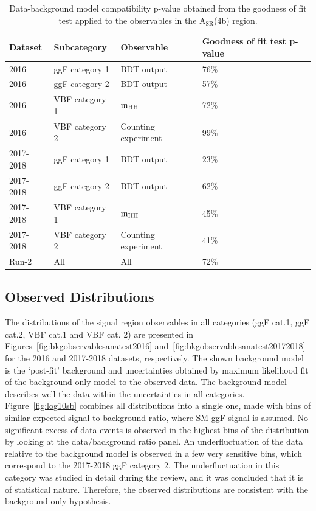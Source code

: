 \begin{table}[htbp!]
\caption[Data-background model compatibility p-value obtained from the goodness of fit test in the analysis region observables]{\label{tab:anacompatibilty} Data-background model compatibility p-value obtained from the goodness of fit test applied to the observables in the $\mathrm{A_{SR}}$(4b) region.}
\centering
\begin{tabularx}{\textwidth}{lllX}
    \hline
    Dataset          & Subcategory    & Observable           &  Goodness of fit test p-value\\    
    \hline
    2016      & ggF category 1 & BDT output  & 76\% \\
    2016      & ggF category 2 & BDT output  & 57\% \\
    2016      & VBF category 1 & $\mathrm{m_{HH}}$               & 72\% \\
    2016      & VBF category 2 & Counting experiment  & 99\% \\
    2017-2018 & ggF category 1 & BDT output  & 23\% \\
    2017-2018 & ggF category 2 & BDT output  & 62\% \\
    2017-2018 & VBF category 1 & $\mathrm{m_{HH}}$               & 45\% \\
    2017-2018 & VBF category 2 & Counting experiment  & 41\% \\
    Run-2     & All            & All                  & 72\% \\ 
    \hline
\end{tabularx}
\end{table}

\subsection{Observed Distributions} \label{results:obsdistributions}
The distributions of the signal region observables in all categories (ggF cat.1, ggF cat.2, VBF cat.1 and VBF cat. 2) are presented in Figures~\ref{fig:bkgobservablesanatest2016} and~\ref{fig:bkgobservablesanatest20172018} for the 2016 and 2017-2018 datasets, respectively. The shown background model is the `post-fit' background and uncertainties obtained by maximum likelihood fit of the background-only model to the observed data. The background model describes well the data within the uncertainties in all categories. Figure~\ref{fig:log10sb} combines all distributions into a single one, made with bins of similar expected signal-to-background ratio, where SM ggF signal is assumed. No significant excess of data events is observed in the highest bins of the distribution by looking at the data/background ratio panel.  An underfluctuation of the data relative to the background model is observed in a few very sensitive bins, which correspond to the 2017-2018 ggF category 2. The underfluctuation in this category was studied in detail during the review, and it was concluded that it is of statistical nature. Therefore, the observed distributions are consistent with the background-only hypothesis.

